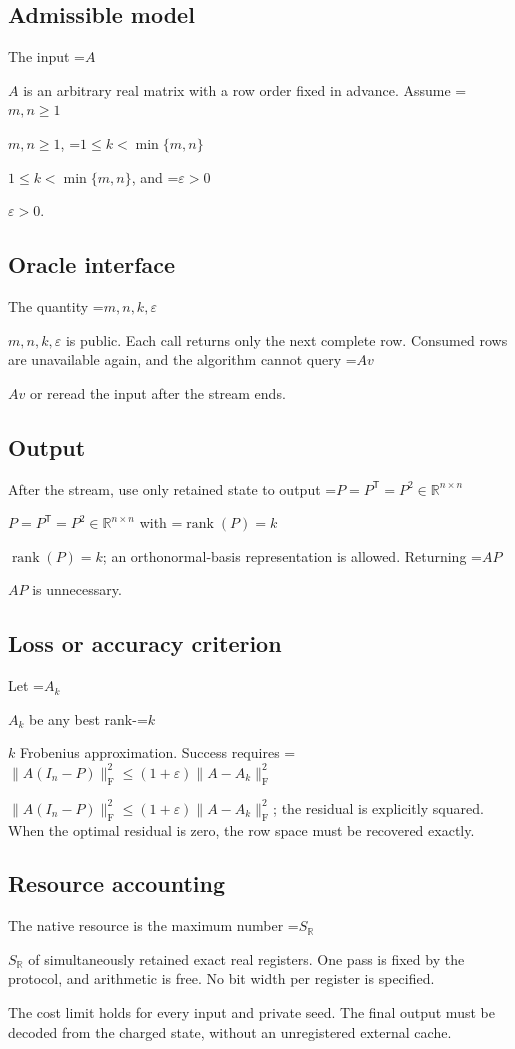 \documentclass[10pt,a4paper]{article}
\newcommand{\AtlasMath}[1]{\par\begingroup\centering\setbox0=\hbox{$\displaystyle #1$}\ifdim\wd0>1.4\linewidth\typeout{ATLAS WIDE FORMULA: \the\wd0}\fi\ifdim\wd0>\linewidth\resizebox{\linewidth}{!}{\box0}\else\box0\fi\par\endgroup}
\newcommand{\AtlasInlineMath}[1]{\begingroup\setbox0=\hbox{$#1$}\ifdim\wd0>.4\linewidth\endgroup\AtlasMath{#1}\else\endgroup$#1$\fi}
\begin{document}
\subsection{Admissible model}
The input \AtlasInlineMath{A} is an arbitrary real matrix with a row order fixed in advance. Assume \AtlasInlineMath{m,n\ge1}, \AtlasInlineMath{1\le k<\min\{m,n\}}, and \AtlasInlineMath{\varepsilon>0}.

\subsection{Oracle interface}
The quantity \AtlasInlineMath{m,n,k,\varepsilon} is public. Each call returns only the next complete row. Consumed rows are unavailable again, and the algorithm cannot query \AtlasInlineMath{Av} or reread the input after the stream ends.

\subsection{Output}
After the stream, use only retained state to output \AtlasInlineMath{P=P^{\mathsf T}=P^2\in\mathbb{R}^{n\times n}} with \AtlasInlineMath{\operatorname{rank}(P)=k}; an orthonormal-basis representation is allowed. Returning \AtlasInlineMath{AP} is unnecessary.

\subsection{Loss or accuracy criterion}
Let \AtlasInlineMath{A_k} be any best rank-\AtlasInlineMath{k} Frobenius approximation. Success requires \AtlasInlineMath{\|A(I_n-P)\|_{\mathrm{F}}^2\le(1+\varepsilon)\|A-A_k\|_{\mathrm{F}}^2}; the residual is explicitly squared. When the optimal residual is zero, the row space must be recovered exactly.

\subsection{Resource accounting}
The native resource is the maximum number \AtlasInlineMath{S_{\mathbb R}} of simultaneously retained exact real registers. One pass is fixed by the protocol, and arithmetic is free. No bit width per register is specified.

The cost limit holds for every input and private seed. The final output must be decoded from the charged state, without an unregistered external cache.
\end{document}

